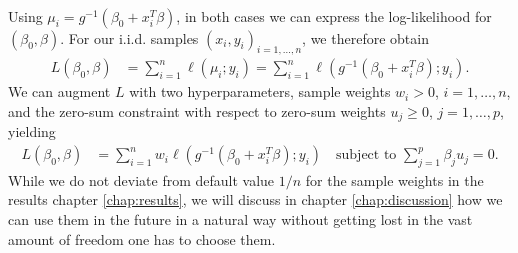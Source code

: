 \paragraph{}
Using $\mu_i = g^{-1}(\beta_0 + x_i^T \beta)$, in both cases we can express the 
log-likelihood 
for $(\beta_0, \beta)$. For our i.i.d. samples $(x_i, y_i)_{i = 1, \ldots, n}$, we therefore obtain 
\begin{align}
    L(\beta_0, \beta) &= \sum_{i=1}^n \ell(\mu_i; y_i) 
    = \sum_{i=1}^n \ell\left( g^{-1}\left( \beta_0 + x_i^T \beta \right); y_i \right).
\end{align}
We can augment $L$ with two hyperparameters, sample weights $w_i > 0$, $i = 1, \ldots, n$, and the 
zero-sum constraint with respect to zero-sum weights $u_j \geq 0$, $j = 1, \ldots, p$, yielding 
\begin{align} \label{eq:loss-glm-no-lasso}
    L(\beta_0, \beta) &= \sum_{i=1}^n w_i \ell\left( g^{-1}\left( \beta_0 + x_i^T \beta \right); 
    y_i \right) \quad \text{subject to } \sum_{j=1}^p \beta_j u_j = 0.
\end{align}
While we do not deviate from default value $1/n$ for the sample weights in the results chapter 
\ref{chap:results}, we will discuss in chapter \ref{chap:discussion} how we can use them in the 
future in a natural way without getting lost in the vast amount of freedom one has to choose them.

